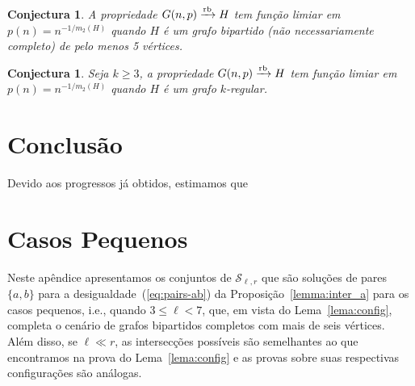 \documentclass[12pt,a4paper]{book}
\newcommand{\K}{K_{\ell,r}} %
\newcommand{\Slr}{\mathcal{S}_{\ell,r}} %
\def\rbarrow{\xrightarrow[]{\raisebox{0.0mm}[0mm]{$\scriptstyle \rm rb$}}}
\newtheorem{conjectura}[teorema] {Conjectura}
\begin{document}


\begin{conjectura}\label{conj:antibipartidos}
     A propriedade $G(n,p)\rbarrow H$ tem função limiar em  $p(n) =  n^{-1/m_2(H)}$ quando $H$ é um grafo bipartido (não necessariamente completo) de pelo menos 5 vértices.
\end{conjectura}

\begin{conjectura}\label{conj:antiregulares}
     Seja $k \geq 3$, a propriedade $G(n,p)\rbarrow H$ tem função limiar em  $p(n) =  n^{-1/m_2(H)}$ quando $H$ é um grafo $k$-regular.
\end{conjectura}

\chapter{Conclusão}
\label{sec:conclusao}

Devido aos progressos já obtidos, estimamos que 


\appendix
\chapter{Casos Pequenos}\label{cap:app}

Neste apêndice apresentamos os conjuntos de $\Slr$ 
que são soluções de pares $\{a,b\}$ para a desigualdade~(\ref{eq:pairs-ab})
da Proposição~\ref{lemma:inter_a} para os casos pequenos, i.e., quando $3 \leq \ell < 7$, 
que, em vista do Lema~\ref{lema:config}, completa o cenário de grafos bipartidos completos com mais de seis vértices.
%
Além disso, se $\ell \ll r$, as intersecções possíveis são semelhantes ao que encontramos na prova do Lema~\ref{lema:config} e as provas sobre suas respectivas configurações são análogas.  
\end{document}
